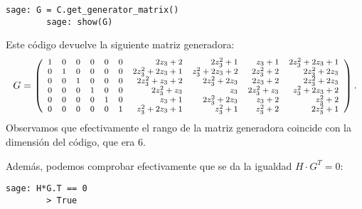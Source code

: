 \begin{exampleth}
    \begin{lstlisting}[gobble=4]
        sage: G = C.get_generator_matrix()
        sage: show(G)
    \end{lstlisting}

    Este código devuelve la siguiente matriz generadora:
    \[ 
        \footnotesize
        G = 
        \left(\begin{array}{rrrrrrrrrr}
        1 & 0 & 0 & 0 & 0 & 0 & 2 z_{3} + 2 & 2 z_{3}^{2} + 1 & z_{3} + 1 & 2 z_{3}^{2} + 2 z_{3} + 1 \\
        0 & 1 & 0 & 0 & 0 & 0 & 2 z_{3}^{2} + 2 z_{3} + 1 & z_{3}^{2} + 2 z_{3} + 2 & 2 z_{3}^{2} + 2 & 2 z_{3}^{2} + 2 z_{3} \\
        0 & 0 & 1 & 0 & 0 & 0 & 2 z_{3}^{2} + z_{3} + 2 & 2 z_{3}^{2} + 2 z_{3} & 2 z_{3} + 2 & 2 z_{3}^{2} + 2 z_{3} \\
        0 & 0 & 0 & 1 & 0 & 0 & 2 z_{3}^{2} + z_{3} & z_{3} & 2 z_{3}^{2} + z_{3} & z_{3}^{2} + 2 z_{3} + 2 \\
        0 & 0 & 0 & 0 & 1 & 0 & z_{3} + 1 & 2 z_{3}^{2} + 2 z_{3} & z_{3} + 2 & z_{3}^{2} + 2 \\
        0 & 0 & 0 & 0 & 0 & 1 & z_{3}^{2} + 2 z_{3} + 1 & z_{3}^{2} + 1 & z_{3}^{2} + 2 & 2 z_{3}^{2} + 1
        \end{array}\right).
    \]
    Observamos que efectivamente el rango de la matriz generadora coincide con la dimensión del código, que era $6$.

    Además, podemos comprobar efectivamente que se da la igualdad $H \cdot G^T = 0$:

    \begin{lstlisting}[gobble=4]
        sage: H*G.T == 0
        > True
    \end{lstlisting}
\end{exampleth}

